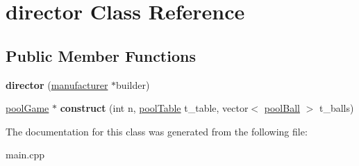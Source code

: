 \hypertarget{classdirector}{}\section{director Class Reference}
\label{classdirector}
\subsection*{Public Member Functions}
\begin{DoxyCompactItemize}
\item 
\mbox{\label{classdirector_aec973b938b96f5e0a2a1995a2204e66a}} 
{\bfseries director} (\mbox{\hyperlink{classmanufacturer}{manufacturer}} $\ast$builder)
\item 
\mbox{\label{classdirector_aa322af5ca7653c81caec2d6e0cbc37d8}} 
\mbox{\hyperlink{classpool_game}{pool\+Game}} $\ast$ {\bfseries construct} (int n, \mbox{\hyperlink{classpool_table}{pool\+Table}} t\+\_\+table, vector$<$ \mbox{\hyperlink{classpool_ball}{pool\+Ball}} $>$ t\+\_\+balls)
\end{DoxyCompactItemize}


The documentation for this class was generated from the following file\+:\begin{DoxyCompactItemize}
\item 
main.\+cpp\end{DoxyCompactItemize}
